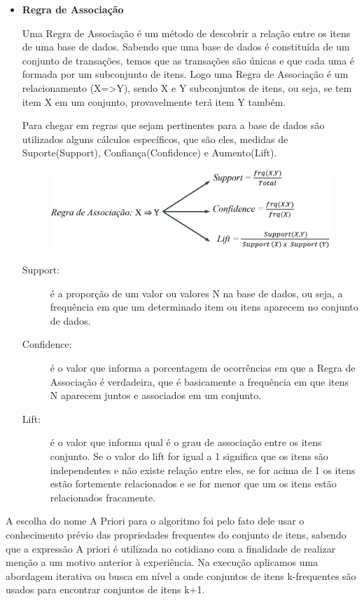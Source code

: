 \documentclass[tcc1]{uftex}
\begin{document}
\begin{itemize}
 \setlength{\parindent}{1.25cm}
 \item\textbf{Regra de Associação}
  
  Uma Regra de Associação é um método de descobrir a relação entre os itens de uma base de dados. Sabendo que uma base de dados é constituída de um conjunto de transações, temos que as transações são únicas e que cada uma é formada por um subconjunto de itens. Logo uma Regra de Associação é um relacionamento (X=>Y), sendo X e Y subconjuntos de itens, ou seja, se tem item X em um conjunto, provavelmente terá item Y também.
  
  Para chegar em regras que sejam pertinentes para a base de dados são utilizados alguns cálculos específicos, que são eles, medidas de  Suporte(Support), Confiança(Confidence) e Aumento(Lift).
    \begin{figure}[!h]
    \centering
    \includegraphics[width=12cm]{formula_000.jpeg}
    \end{figure}
    \begin{description}
    \item[Support:] é a proporção de um valor ou valores N na base de dados, ou seja, a frequência em que um determinado item ou itens aparecem no conjunto de dados. 
    \item[Confidence:] é o valor que informa a porcentagem de ocorrências em que a Regra de Associação é verdadeira, que é basicamente a frequência em que itens N aparecem juntos e associados em um conjunto. 
    \item[Lift:] é o valor que informa qual é o grau de associação entre os itens conjunto. Se o valor do lift for igual a 1 significa que os itens são independentes e não existe relação entre eles, se for acima de 1 os itens estão fortemente relacionados e se for menor que um os itens estão relacionados fracamente. 
    \end{description}

 \end{itemize}

A escolha do nome  A Priori para o algoritmo foi pelo fato dele usar o conhecimento prévio das propriedades frequentes do conjunto de itens, sabendo que a expressão A priori é utilizada no cotidiano com a finalidade de realizar menção a um motivo anterior à experiência. Na execução aplicamos uma abordagem iterativa ou busca em nível a onde conjuntos de itens k-frequentes são usados para encontrar conjuntos de itens k+1. 
\end{document}
